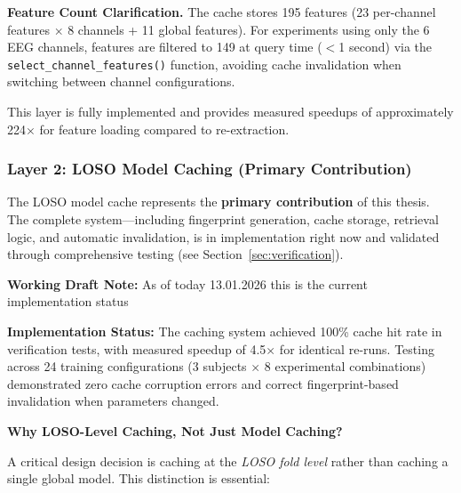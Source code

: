 \documentclass{imc-inf} %
\begin{document}
\textbf{Feature Count Clarification.} The cache stores 195 features (23 per-channel features $\times$ 8 channels + 11 global features). For experiments using only the 6 EEG channels, features are filtered to 149 at query time ($<$1 second) via the \texttt{select\_channel\_features()} function, avoiding cache invalidation when switching between channel configurations.

This layer is fully implemented and provides measured speedups of approximately 224$\times$ for feature loading compared to re-extraction.

\subsubsection{Layer 2: LOSO Model Caching (Primary Contribution)}
\label{sec:loso_caching}

The LOSO model cache represents the \textbf{primary contribution} of this thesis. 
The complete system—including fingerprint generation, cache storage, retrieval logic, and automatic invalidation, is in implementation right now and validated through comprehensive testing (see Section~\ref{sec:verification}).



\begin{center}
\colorbox{yellow!20}{%
\begin{minipage}{0.9\textwidth}
\textbf{Working Draft Note:} 
As of today 13.01.2026 this is the current implementation status
\end{minipage}
}
\end{center}

\textbf{Implementation Status:} The caching system achieved 100\% cache hit rate 
in verification tests, with measured speedup of 4.5$\times$ for identical re-runs. 
Testing across 24 training configurations (3 subjects $\times$ 8 experimental 
combinations) demonstrated zero cache corruption errors and correct fingerprint-based 
invalidation when parameters changed.

\textbf{Why LOSO-Level Caching, Not Just Model Caching?}

A critical design decision is caching at the \textit{LOSO fold level} rather than caching a single global model. This distinction is essential:
\end{document}

